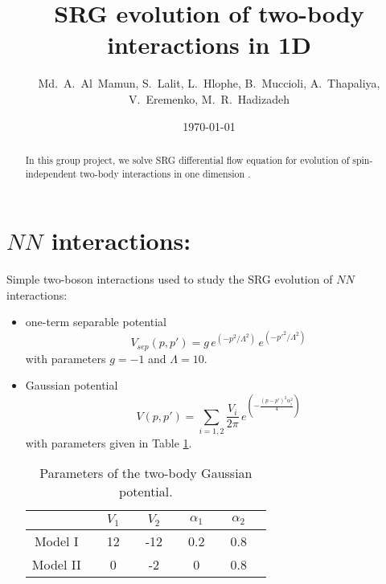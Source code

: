 \documentclass[aps,prc,preprint,groupedaddress]{revtex4-1}
\begin{document}
\title{SRG evolution of two-body interactions in 1D}

\author{Md.~A.~Al~Mamun, S.~Lalit, L.~Hlophe, B.~Muccioli,  A.~Thapaliya, V.~Eremenko, M.~R.~Hadizadeh}




\date{\today}

\begin{abstract}
In this group project, we solve SRG differential flow equation for evolution of spin-independent two-body interactions in one dimension \cite{Akerlund-EPJA}. 
\end{abstract}



\maketitle





\section{$NN$ interactions:}
	
Simple two-boson interactions used to study the SRG evolution of $NN$ interactions:

\begin{itemize}
\item one-term separable potential
\begin{equation}
V_{sep}(p,p') = g \, e^{(-p^2/\Lambda^2)}\, e^{(-p'^2/\Lambda^2)} 
\end{equation}
with parameters $g=-1$ and $\Lambda=10$.

\item Gaussian potential
\begin{equation}
V(p,p') = \sum_{i=1,2} \frac{V_i}{2\pi} \, e^ {\left(  - \frac{ (p-p')^2 \alpha_i^2}{4} \right)} 
\end{equation}
with parameters given in Table \ref{tab:gaussian}.
\begin{table}[H]
\begin{center}
\label{tab:gaussian}
\begin{tabular}{c|ccccccccc}
&&$V_1$ && $V_2$ && $\alpha_1$ && $\alpha_2$ \\ \hline
 Model I &&12 &&  -12 && 0.2 && 0.8\\
Model II && 0 &&  -2 && 0 && 0.8\\
\end{tabular}
\end{center}
\caption{Parameters of the two-body Gaussian potential.}
\end{table}


\end{itemize}
\end{document}
